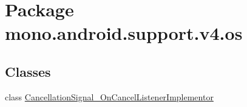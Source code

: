 \hypertarget{namespacemono_1_1android_1_1support_1_1v4_1_1os}{
\section{Package mono.android.support.v4.os}
\label{namespacemono_1_1android_1_1support_1_1v4_1_1os}
}
\subsection*{Classes}
\begin{CompactItemize}
\item 
class \hyperlink{classmono_1_1android_1_1support_1_1v4_1_1os_1_1_cancellation_signal___on_cancel_listener_implementor}{CancellationSignal\_\-OnCancelListenerImplementor}
\end{CompactItemize}
